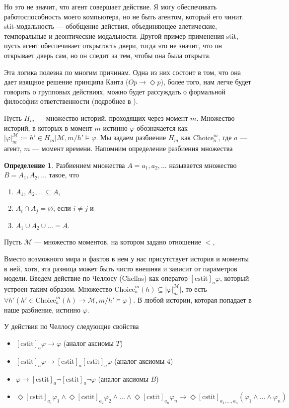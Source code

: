 \documentclass[openany]{book}
\theoremstyle{plain}
\theoremstyle{definition}
\newtheorem{defn}{Определение}[section]
\begin{document}
Но это не значит, что агент совершает действие. Я могу обеспечивать работоспособность моего компьютера, но не быть агентом, который его чинит. stit-модальность --- обобщение действия, объединяющее алетические, темпоральные и деонтические модальности. Другой пример применения stit, пусть агент обеспечивает открытость двери, тогда это не значит, что он открывает дверь сам, но он следит за тем, чтобы она была открыта.

Эта логика полезна по многим причинам. Одна из них состоит в том, что она дает изящное решение принципа Канта (\(O p \to \Diamond p\)), более того, нам легче будет говорить о групповых действиях, можно будет рассуждать о формальной философии ответственности (подробнее в \cite{Duijf}).

Пусть \(H_m\) --- множество историй, проходящих через момент \(m\). Множество историй, в которых в момент \(m\) истинно \(\varphi\) обозначается как \(|\varphi|_m^{\mathcal{M}} := {h' \in H_m | \mathcal{M}, m/h' \models \varphi}\). Мы задаем разбиение \(H_m\) как \(\mathrm{Choice}_a^m\), где \(a\) --- агент, \(m\) --- момент времени. Напомним определение разбиения множества 
\begin{defn}
    Разбиением множества \(A = {a_1, a_2, \dots}\) называется множество \(B = {A_1, A_2, \dots}\) такое, что
    \begin{enumerate}
	\item \(A_1, A_2, \dots \subseteq A\),
	\item \(A_i \cap A_j = \varnothing\), если \(i \not= j\) и
	\item \(A_1 \cup A_2 \cup \dots = A\).
    \end{enumerate}
\end{defn}

Пусть \(\mathcal{M}\) --- множество моментов, на котором задано отношение \(<\), 

Вместо возможного мира и фактов в нем у нас присутствует история и моменты в ней, хотя, эта разница может быть чисто внешняя и зависит от параметров модели. Введем действие по Челлосу (Chellas) как оператор \([\mathrm{cstit}]_a \varphi\), который устроен таким образом. Множество \(\mathrm{Choice}_a^m (h) \subseteq |\varphi|_m^{\mathcal{M}}|\), то есть \(\forall h' (h' \in \mathrm{Choice}_a^m (h) \to \mathcal{M}, m/h' \models \varphi)\). В любой истории, которая попадает в наше разбиение, истинно \(\varphi\). 

У действия по Челлосу следующие свойства
\begin{itemize}
    \item \([\mathrm{cstit}]_a \varphi \to \varphi\) (аналог аксиомы \(T\))
    \item \([\mathrm{cstit}]_a \varphi \to [\mathrm{cstit}]_a [\mathrm{cstit}]_a \varphi\) (аналог аксиомы \(4\))
    \item \(\varphi \to  [\mathrm{cstit}]_a \neg [\mathrm{cstit}]_a \neg \varphi\) (аналог аксиомы \(B\))
    \item \(\Diamond [\mathrm{cstit}]_{a_1} \varphi_1 \land \Diamond[\mathrm{cstit}]_{a_2} \varphi_2 \land \dots \land \Diamond[\mathrm{cstit}]_{a_n} \varphi_n \to \Diamond [\mathrm{cstit}]_{a_1, \ldots, a_n} (\varphi_1 \land \dots \land \varphi_n) \)
\end{itemize}
\end{document}
